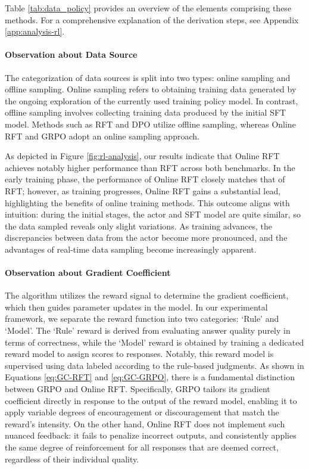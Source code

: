 \begin{itemize}[topsep=0pt]
Table \ref{tab:data_policy} provides an overview of the elements comprising these methods. For a comprehensive explanation of the derivation steps, see Appendix \ref{app:analysis-rl}.

\paragraph{Observation about Data Source} The categorization of data sources is split into two types: online sampling and offline sampling. Online sampling refers to obtaining training data generated by the ongoing exploration of the currently used training policy model. In contrast, offline sampling involves collecting training data produced by the initial SFT model. Methods such as RFT and DPO utilize offline sampling, whereas Online RFT and GRPO adopt an online sampling approach.

As depicted in Figure \ref{fig:rl-analysis}, our results indicate that Online RFT achieves notably higher performance than RFT across both benchmarks. In the early training phase, the performance of Online RFT closely matches that of RFT; however, as training progresses, Online RFT gains a substantial lead, highlighting the benefits of online training methods. This outcome aligns with intuition: during the initial stages, the actor and SFT model are quite similar, so the data sampled reveals only slight variations. As training advances, the discrepancies between data from the actor become more pronounced, and the advantages of real-time data sampling become increasingly apparent.

\paragraph{Observation about Gradient Coefficient} The algorithm utilizes the reward signal to determine the gradient coefficient, which then guides parameter updates in the model. In our experimental framework, we separate the reward function into two categories: `Rule' and `Model'. The `Rule' reward is derived from evaluating answer quality purely in terms of correctness, while the `Model' reward is obtained by training a dedicated reward model to assign scores to responses. Notably, this reward model is supervised using data labeled according to the rule-based judgments. As shown in Equations \ref{eq:GC-RFT} and \ref{eq:GC-GRPO}, there is a fundamental distinction between GRPO and Online RFT. Specifically, GRPO tailors its gradient coefficient directly in response to the output of the reward model, enabling it to apply variable degrees of encouragement or discouragement that match the reward's intensity. On the other hand, Online RFT does not implement such nuanced feedback: it fails to penalize incorrect outputs, and consistently applies the same degree of reinforcement for all responses that are deemed correct, regardless of their individual quality.


\end{itemize}
